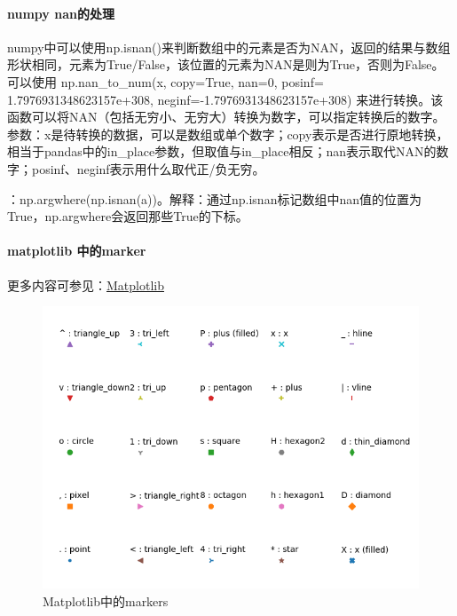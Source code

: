 \paragraph{numpy nan的处理}numpy中可以使用np.isnan()来判断数组中的元素是否为NAN，返回的结果与数组形状相同，元素为True/False，该位置的元素为NAN是则为True，否则为False。可以使用 np.nan\_to\_num(x, copy=True, nan=0, posinf= 1.7976931348623157e+308, neginf=-1.7976931348623157e+308) 来进行转换。该函数可以将NAN（包括无穷小、无穷大）转换为数字，可以指定转换后的数字。参数：x是待转换的数据，可以是数组或单个数字；copy表示是否进行原地转换，相当于pandas中的in\_place参数，但取值与in\_place相反；nan表示取代NAN的数字；posinf、neginf表示用什么取代正/负无穷。

：np.argwhere(np.isnan(a))。解释：通过np.isnan标记数组中nan值的位置为True，np.argwhere会返回那些True的下标。


\paragraph{matplotlib 中的marker}更多内容可参见：\href{https://matplotlib.org/api/_as_gen/matplotlib.pyplot.plot.html#matplotlib.pyplot.plot}{Matplotlib}
\begin{figure}[h]
	\centering
	\includegraphics[width=.8\textwidth]{pics/markers.png}
	\caption{Matplotlib中的markers}
\end{figure}






